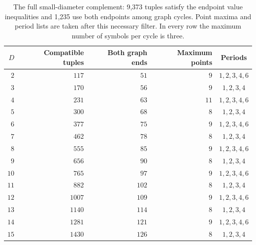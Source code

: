 \begin{table}[htbp]
\centering\small
\begin{tabular}{@{}r r r r c@{}}
\toprule
$D$ & Compatible tuples & Both graph ends & Maximum points & Periods\\
\midrule
$2$  & $117$  & $51$  & $9$  & $1,2,3,4,6$\\
$3$  & $170$  & $56$  & $9$  & $1,2,3,4$\\
$4$  & $231$  & $63$  & $11$ & $1,2,3,4,6$\\
$5$  & $300$  & $68$  & $8$  & $1,2,3,4$\\
$6$  & $377$  & $75$  & $9$  & $1,2,3,4,6$\\
$7$  & $462$  & $78$  & $8$  & $1,2,3,4$\\
$8$  & $555$  & $85$  & $9$  & $1,2,3,4,6$\\
$9$  & $656$  & $90$  & $8$  & $1,2,3,4$\\
$10$ & $765$  & $97$  & $9$  & $1,2,3,4,6$\\
$11$ & $882$  & $102$ & $8$  & $1,2,3,4$\\
$12$ & $1007$ & $109$ & $9$  & $1,2,3,4,6$\\
$13$ & $1140$ & $114$ & $8$  & $1,2,3,4$\\
$14$ & $1281$ & $121$ & $9$  & $1,2,3,4,6$\\
$15$ & $1430$ & $126$ & $8$  & $1,2,3,4$\\
\bottomrule
\end{tabular}
\caption{The full small-diameter complement: 9,373 tuples satisfy the
endpoint value inequalities and 1,235 use both endpoints among graph
cycles. Point maxima and period lists are taken after this necessary
filter. In every row the maximum number of symbols per cycle is three.}
\label{tab:small}
\end{table}

